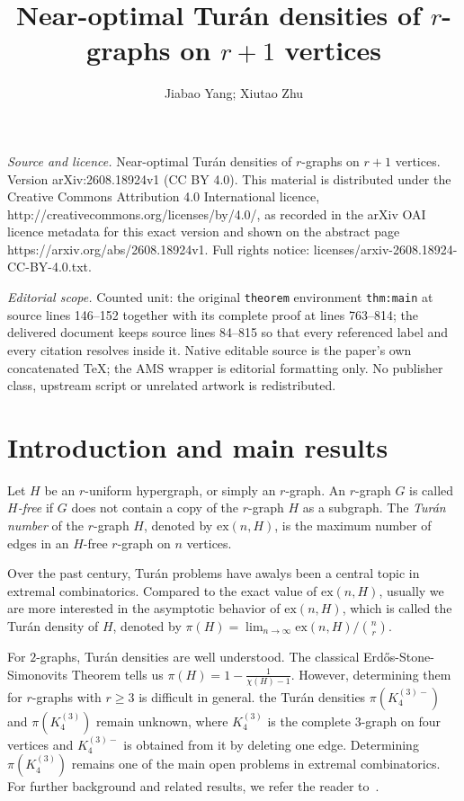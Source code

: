 \documentclass[10pt,a4paper]{amsart}
\numberwithin{equation}{section}
\begin{document}
\title[Near-optimal Tur'an densities of r-graphs on r+1 vertices]{Near-optimal Tur\'an densities of $r$-graphs on $r+1$ vertices}
\author{Jiabao Yang; Xiutao Zhu}
\date{}
\maketitle
\noindent\emph{Source and licence.} Near-optimal Tur\'an densities of $r$-graphs on $r+1$ vertices. Version arXiv:2608.18924v1 (CC BY 4.0). This material is distributed under the Creative Commons Attribution 4.0 International licence, http://creativecommons.org/licenses/by/4.0/, as recorded in the arXiv OAI licence metadata for this exact version and shown on the abstract page https://arxiv.org/abs/2608.18924v1. Full rights notice: licenses/arxiv-2608.18924-CC-BY-4.0.txt.\par\smallskip
\noindent\textit{Editorial scope.} Counted unit: the original \texttt{theorem} environment \texttt{thm:main} at source lines 146--152 together with its complete proof at lines 763--814; the delivered document keeps source lines 84--815 so that every referenced label and every citation resolves inside it. Native editable source is the paper's own concatenated TeX; the AMS wrapper is editorial formatting only. No publisher class, upstream script or unrelated artwork is redistributed.
\section{Introduction and main results}

Let $H$ be an $r$-uniform hypergraph, or simply an $r$-graph.
An $r$-graph $G$ is called {\em $H$-free} if $G$ does not contain a copy of the $r$-graph $H$ as a subgraph.
The {\em Tur\'{a}n number} of the $r$-graph $H$, denoted by $\mathrm{ex}(n,H)$, is the maximum number of edges in an $H$-free $r$-graph on $n$ vertices. 


Over the past century, Tur\'an problems have awalys been a central topic in extremal combinatorics. 
Compared to the exact value of $\mathrm{ex}(n,H)$,  usually we are more interested in the asymptotic behavior of $\mathrm{ex}(n,H)$, which is called the Tur\'an density of $H$, denoted by
$\pi(H)=\lim_{n\to\infty} \mathrm{ex}(n,H)/\binom {n}{r}.$


For $2$-graphs, Tur\'an densities are well understood. The classical Erd\H{o}s-Stone-Simonovits Theorem \cite{Er, stone} tells us $\pi(H)=1-\frac{1}{\chi(H)-1}$. However,  determining them for $r$-graphs with $r\ge 3$ is difficult in general.
the Tur\'an densities $\pi(K_4^{(3)-})$ and $\pi(K_4^{(3)})$  remain unknown, where $K_4^{(3)}$ is the complete $3$-graph on four vertices and $K_4^{(3)-}$ is obtained from it by deleting one edge.
Determining $\pi(K_4^{(3)})$ remains one of the main open problems in extremal combinatorics.
For further background and related results, we refer the reader to~\cite{deCaen1994,Furedi1991,Keevash2011,Sidorenko1995}.
\end{document}
